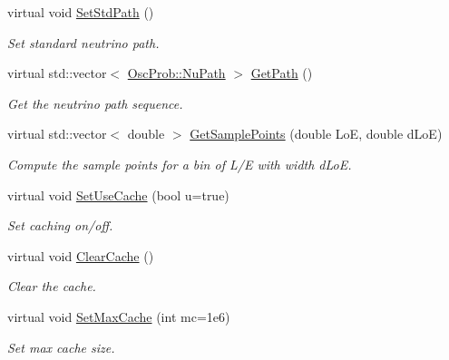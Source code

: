 \begin{DoxyCompactItemize}
virtual void \hyperlink{classOscProb_1_1PMNS__Base_add6533a9fc9acdfc7ae258b62570d78d}{Set\+Std\+Path} ()
\begin{DoxyCompactList}\small\item\em Set standard neutrino path. \end{DoxyCompactList}\item 
virtual std\+::vector$<$ \hyperlink{structOscProb_1_1NuPath}{Osc\+Prob\+::\+Nu\+Path} $>$ \hyperlink{classOscProb_1_1PMNS__Base_ac8e196f2e85a2b1caaf705073ee95a5c}{Get\+Path} ()
\begin{DoxyCompactList}\small\item\em Get the neutrino path sequence. \end{DoxyCompactList}\item 
virtual std\+::vector$<$ double $>$ \hyperlink{classOscProb_1_1PMNS__Base_a9eac8d768c1424755ee41f7e783af179}{Get\+Sample\+Points} (double LoE, double d\+LoE)
\begin{DoxyCompactList}\small\item\em Compute the sample points for a bin of L/E with width d\+LoE. \end{DoxyCompactList}\item 
virtual void \hyperlink{classOscProb_1_1PMNS__Base_aa94c1e1fff0ba731c75f7e633b023a9f}{Set\+Use\+Cache} (bool u=true)
\begin{DoxyCompactList}\small\item\em Set caching on/off. \end{DoxyCompactList}\item 
virtual void \hyperlink{classOscProb_1_1PMNS__Base_ac47fd33e69aa6490f99e2fd147a92f03}{Clear\+Cache} ()
\begin{DoxyCompactList}\small\item\em Clear the cache. \end{DoxyCompactList}\item 
virtual void \hyperlink{classOscProb_1_1PMNS__Base_ae67862cf58b0802487a14b047b012a78}{Set\+Max\+Cache} (int mc=1e6)
\begin{DoxyCompactList}\small\item\em Set max cache size. \end{DoxyCompactList}\end{DoxyCompactItemize}
